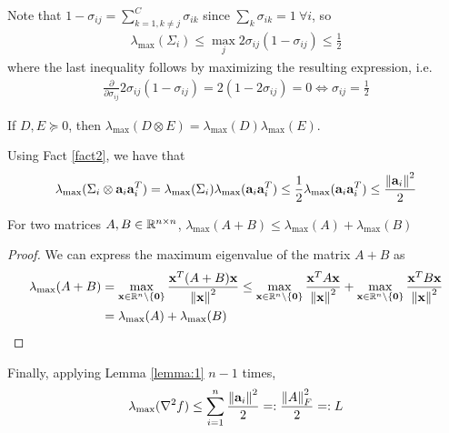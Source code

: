 \documentclass{article}
\begin{document}
\begin{enumerate}[label=1.I.\arabic*]
    Note that $1-\sigma_{ij}=\sum_{k=1, k\neq j}^C \sigma_{ik}$ since $\sum_k \sigma_{ik}=1\ \forall i$, so
    \begin{align}
        \lambda_{\max} (\Sigma_i) \leq \max_j 2 \sigma_{ij} (1-\sigma_{ij}) \leq \frac{1}{2}
    \end{align}
    where the last inequality follows by maximizing the resulting expression, i.e.
    \begin{align}
        \frac{\partial}{\partial \sigma_{ij}} 2 \sigma_{ij} (1-\sigma_{ij}) = 2(1- 2 \sigma_{ij}) = 0 \Longleftrightarrow \sigma_{ij} = \frac{1}{2}
    \end{align}
    
    \begin{fact}
        If $D, E \succeq 0$, then $\lambda_{\max}(D \otimes E) = \lambda_{\max}(D)\lambda_{\max}(E)$.
        \label{fact2}
    \end{fact}
    
    Using Fact \ref{fact2}, we have that
    \begin{align}
         \lambda_{\max} (\Sigma_i \otimes \mathbf{a}_i \mathbf{a}_i^T) = \lambda_{\max} (\Sigma_i ) \lambda_{\max}(\mathbf{a}_i \mathbf{a}_i^T) \leq \frac{1}{2}\lambda_{\max}(\mathbf{a}_i \mathbf{a}_i^T) \leq \frac{\left\lVert\mathbf{a}_i\right\rVert^2}{2}
    \end{align}
    
    \begin{lemma}
        For two matrices $A, B \in \mathbb{R}^{n\times n}$, $\lambda_{\max}(A+B)\leq \lambda_{\max}(A)+\lambda_{\max}(B)$
        \label{lemma:1}
    \end{lemma}
    \begin{proof}
        We can express the maximum eigenvalue of the matrix $A+B$ as
        \begin{align}
            \lambda_{\max}(A+B)&=\max_{\mathbf{x} \in \mathbb{R}^n\setminus\{\mathbf{0}\} }\frac{\mathbf{x} ^T (A+B)\mathbf{x}}{\left\lVert\mathbf{x}\right\rVert^2} \leq \max_{\mathbf{x} \in \mathbb{R}^n \setminus\{\mathbf{0}\}}\frac{\mathbf{x} ^T A\mathbf{x}}{\left\lVert\mathbf{x}\right\rVert^2}+\max_{\mathbf{x} \in \mathbb{R}^n\setminus\{\mathbf{0}\} }\frac{\mathbf{x} ^T B\mathbf{x}}{\left\lVert\mathbf{x}\right\rVert^2}\\
            &=\lambda_{\max}(A)+\lambda_{\max}(B)
        \end{align}
    \end{proof}
    
    Finally, applying Lemma \ref{lemma:1} $n-1$ times,
    \begin{align}
        \lambda_{\max}(\nabla^2 f) \leq \sum_{i=1}^n \frac{\left\lVert\mathbf{a}_i\right\rVert^2}{2} =: \frac{\left\lVert A\right\rVert^2_F}{2}=:L
    \end{align}
    

\end{enumerate}
\end{document}
